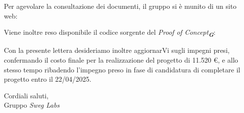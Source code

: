 Per agevolare la consultazione dei documenti, il gruppo si è munito di un sito web:
\begin{center}
\end{center}
Viene inoltre reso disponibile il codice sorgente del \emph{Proof of Concept}\textsubscript{\textit{\textbf{G}}}: 
\begin{center}
\end{center}
Con la presente lettera desideriamo inoltre aggiornarVi sugli impegni presi, confermando il costo finale per la realizzazione del progetto di 11.520 \euro, e allo stesso tempo ribadendo l’impegno preso in fase di candidatura di completare il progetto entro il 22/04/2025.\\
\vspace{1.5cm}

Cordiali saluti,\\
Gruppo \emph{Sweg Labs}

